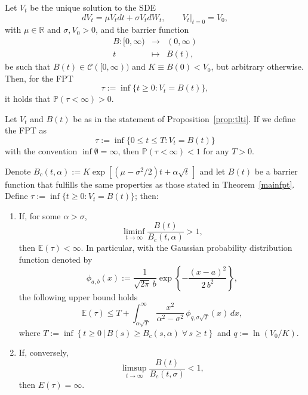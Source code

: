 \documentclass[10pt,a4paper]{amsart}
\begin{document}
\begin{proposition}\label{prop:tlti}
Let $V_t$ be the unique solution to the SDE
$$
dV_t=\mu V_t dt + \sigma V_t dW_t, \qquad \left. V_t \right|_{t=0}= V_0,
$$
with $\mu \in \mathbb{R}$ and $\sigma, V_0>0$, and the barrier function
\begin{eqnarray}\nonumber
B:[0,\infty) &\longrightarrow& (0,\infty) \\ \nonumber
t &\longmapsto& B(t),
\end{eqnarray}
be such that $B(t) \in \mathcal{C}([0,\infty))$ and $K \equiv B(0)<V_0$, but arbitrary otherwise. Then, for the FPT
$$
\tau := \inf \{t \ge 0 : V_t = B(t)\},
$$
it holds that $\mathbb{P}(\tau < \infty) >0$.
\end{proposition}

\begin{corollary}\label{cor:nfpt}
Let $V_t$ and $B(t)$ be as in the statement of Proposition~\ref{prop:tlti}. If we define the FPT as
$$
\tau := \inf \{0 \le t \le T : V_t = B(t)\}
$$
with the convention $\inf \emptyset = \infty$, then $\mathbb{P}(\tau < \infty) < 1$ for any $T>0$.
\end{corollary}

\begin{theorem} 
\label{theor:second_fpt}
Denote $B_c(t,\alpha):=K \exp \left[(\mu-\sigma^2/2)t + \alpha \sqrt{t} \, \right]$ and let $B(t)$ be a barrier function that fulfills the same properties as those stated in Theorem~\ref{mainfpt}. Define $\tau := \inf \{t \ge 0 : V_t = B(t)\}$; then:
\begin{enumerate}[label=(\alph*)]
\item If, for some $\alpha>\sigma$,
$$
\liminf\limits_{t\rightarrow\infty}\dfrac{B(t)}{B_c(t,\alpha)} > 1,
$$
 then $\mathbb{E}(\tau)<\infty$. In particular, with the Gaussian probability distribution function denoted by
$$
\phi_{a,b}(x):=\frac{1}{\sqrt{2\pi} \, b}\exp \left\lbrace -\frac{(x-a)^2}{2 \, b^2} \right\rbrace,
$$
the following upper bound holds
\begin{equation}\nonumber
\mathbb{E}(\tau) \le T + \int_{\alpha\sqrt{T}}^\infty \frac{x^2}{\alpha^2 - \sigma^2} \, \phi_{q,\sigma\sqrt{T}}(x) \, dx,
\end{equation}
where $T:=\inf \left\lbrace t\geq 0 \, \big\vert \, B(s) \ge B_c(s,\alpha) \; \forall \, s \ge t \right\rbrace$ and $q:=\ln(V_0/K)$.
\item If, conversely, 
$$
\limsup\limits_{t\rightarrow\infty}\dfrac{B(t)}{B_c(t,\sigma)} < 1,
$$
then $E(\tau)=\infty$.
\end{enumerate}
\end{theorem}
\end{document}
